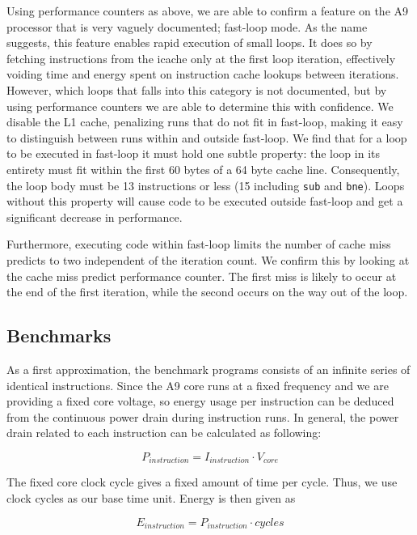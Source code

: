 Using performance counters as above, we are able to confirm a feature on the A9
processor that is very vaguely documented; fast-loop\texttrademark{} mode. As
the name suggests, this feature enables rapid execution of small loops. It does
so by fetching instructions from the icache only at the first loop iteration,
effectively voiding time and energy spent on instruction cache lookups between
iterations. However, which loops that falls into this category is not
documented, but by using performance counters we are able to determine this with
confidence. We disable the L1 cache, penalizing runs that do not fit in
fast-loop, making it easy to distinguish between runs within and outside
fast-loop. We find that for a loop to be executed in fast-loop it must hold one
subtle property: the loop in its entirety must fit within the first 60 bytes of
a 64 byte cache line. Consequently, the loop body must be 13 instructions or
less (15 including \texttt{sub} and \texttt{bne}). Loops without this property
will cause code to be executed outside fast-loop and get a significant decrease
in performance.

Furthermore, executing code within fast-loop limits the number of cache
miss predicts to two independent of the iteration count. We confirm this by
looking at the cache miss predict performance counter. The first miss is likely to
occur at the end of the first iteration, while the second occurs on the way out
of the loop.

\subsection{Benchmarks}
As a first approximation, the benchmark programs consists of an infinite series
of identical instructions. Since the A9 core runs at a fixed frequency and we are
providing a fixed core voltage, so energy usage per instruction can
be deduced from the continuous power drain during instruction runs. In general,
the power drain related to each instruction can be calculated as following:

\begin{equation}
    P_{instruction} = I_{instruction} \cdot V_{core}
    \label{eq:1}
\end{equation}

The fixed core clock cycle gives a fixed amount of time per cycle. Thus, we
use clock cycles as our base time unit. Energy is then given as

\begin{equation}
    E_{instruction} = P_{instruction} \cdot cycles
    \label{eq:2}
\end{equation}

